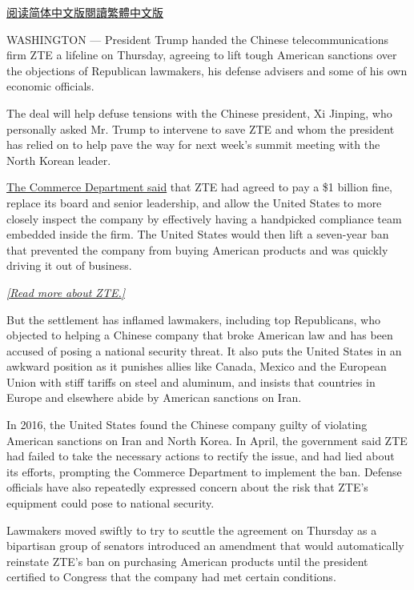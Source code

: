 \href{https://cn.nytimes3xbfgragh.onion/business/20180608/us-china-zte-deal/}{阅读简体中文版}\href{https://cn.nytimes3xbfgragh.onion/business/20180608/us-china-zte-deal/zh-hant/}{閱讀繁體中文版}

WASHINGTON --- President Trump handed the Chinese telecommunications
firm ZTE a lifeline on Thursday, agreeing to lift tough American
sanctions over the objections of Republican lawmakers, his defense
advisers and some of his own economic officials.

The deal will help defuse tensions with the Chinese president, Xi
Jinping, who personally asked Mr. Trump to intervene to save ZTE and
whom the president has relied on to help pave the way for next week's
summit meeting with the North Korean leader.

\href{https://www.commerce.gov/news/press-releases/2018/06/secretary-ross-announces-14-billion-zte-settlement-zte-board-management}{The
Commerce Department said} that ZTE had agreed to pay a \$1 billion fine,
replace its board and senior leadership, and allow the United States to
more closely inspect the company by effectively having a handpicked
compliance team embedded inside the firm. The United States would then
lift a seven-year ban that prevented the company from buying American
products and was quickly driving it out of business.

\href{https://www.nytimes3xbfgragh.onion/2018/06/07/business/what-is-zte.html}{\emph{{[}Read
more about ZTE.{]}}}

But the settlement has inflamed lawmakers, including top Republicans,
who objected to helping a Chinese company that broke American law and
has been accused of posing a national security threat. It also puts the
United States in an awkward position as it punishes allies like Canada,
Mexico and the European Union with stiff tariffs on steel and aluminum,
and insists that countries in Europe and elsewhere abide by American
sanctions on Iran.

In 2016, the United States found the Chinese company guilty of violating
American sanctions on Iran and North Korea. In April, the government
said ZTE had failed to take the necessary actions to rectify the issue,
and had lied about its efforts, prompting the Commerce Department to
implement the ban. Defense officials have also repeatedly expressed
concern about the risk that ZTE's equipment could pose to national
security.

Lawmakers moved swiftly to try to scuttle the agreement on Thursday as a
bipartisan group of senators introduced an amendment that would
automatically reinstate ZTE's ban on purchasing American products until
the president certified to Congress that the company had met certain
conditions.

